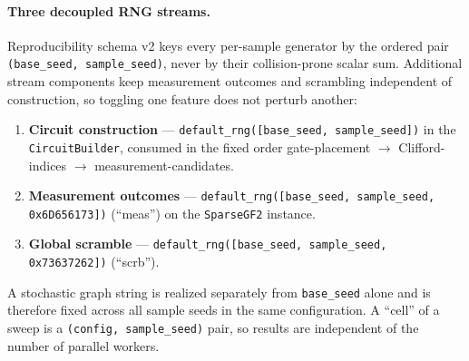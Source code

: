 \documentclass[11pt]{article}
\newcommand{\code}[1]{\texttt{#1}}
\begin{document}
\paragraph{Three decoupled RNG streams.} Reproducibility schema v2 keys every per-sample generator by the ordered
pair \code{(base\_seed, sample\_seed)}, never by their collision-prone scalar sum. Additional stream components
keep measurement outcomes and scrambling independent of construction, so toggling one feature does not perturb
another:
\begin{enumerate}[itemsep=1pt]
\item \textbf{Circuit construction} --- \code{default\_rng([base\_seed, sample\_seed])} in the
\code{CircuitBuilder}, consumed in the fixed order gate-placement $\to$ Clifford-indices $\to$
measurement-candidates.
\item \textbf{Measurement outcomes} --- \code{default\_rng([base\_seed, sample\_seed, 0x6D656173])} (``meas'') on
the \code{SparseGF2} instance.
\item \textbf{Global scramble} --- \code{default\_rng([base\_seed, sample\_seed, 0x73637262])} (``scrb'').
\end{enumerate}
A stochastic graph string is realized separately from \code{base\_seed} alone and is therefore fixed across all
sample seeds in the same configuration.
A ``cell'' of a sweep is a \code{(config, sample\_seed)} pair, so results are independent of the number of
parallel workers.

\end{document}

